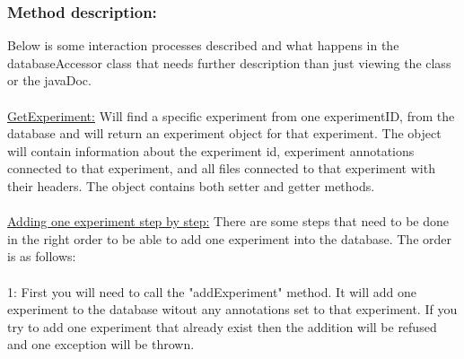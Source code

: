 \subsubsection{Method description:}
Below is some interaction processes described and what happens in the databaseAccessor class that needs further description than just viewing the class or the javaDoc.\\
\\
\underline{GetExperiment:} Will find a specific experiment from one experimentID, from the database and will return an experiment object for that experiment. The object will contain information about the experiment id, experiment annotations connected to that experiment, and all files connected to that experiment with their headers. The object contains both setter and getter methods. \\
\\
\underline{Adding one experiment step by step:}
There are some steps that need to be done in the right order to be able to add one experiment into the database. The order is as follows:\\
\\
1: First you will need to call the "addExperiment" method. It will add one experiment to the database witout any annotations set to that experiment. If you try to add one experiment that already exist then the addition will be refused and one exception will be thrown.

